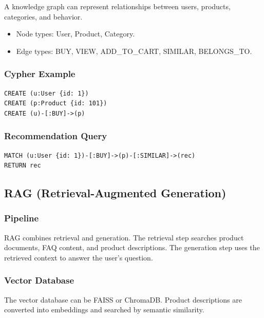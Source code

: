 \documentclass[12pt,a4paper]{article}
\begin{document}
A knowledge graph can represent relationships between users, products, categories, and behavior.

\begin{itemize}
    \item Node types: User, Product, Category.
    \item Edge types: BUY, VIEW, ADD\_TO\_CART, SIMILAR, BELONGS\_TO.
\end{itemize}

\subsubsection{Cypher Example}

\begin{lstlisting}[caption={Neo4j Cypher example.}]
CREATE (u:User {id: 1})
CREATE (p:Product {id: 101})
CREATE (u)-[:BUY]->(p)
\end{lstlisting}

\subsubsection{Recommendation Query}

\begin{lstlisting}[caption={Graph recommendation query.}]
MATCH (u:User {id: 1})-[:BUY]->(p)-[:SIMILAR]->(rec)
RETURN rec
\end{lstlisting}

\subsection{RAG (Retrieval-Augmented Generation)}

\subsubsection{Pipeline}

RAG combines retrieval and generation. The retrieval step searches product documents, FAQ content, and product descriptions. The generation step uses the retrieved context to answer the user's question.

\subsubsection{Vector Database}

The vector database can be FAISS or ChromaDB. Product descriptions are converted into embeddings and searched by semantic similarity.
\end{document}
